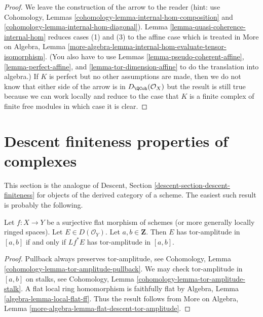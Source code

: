 \begin{proof}
We leave the construction of the arrow to the reader (hint: use
Cohomology, Lemmas \ref{cohomology-lemma-internal-hom-composition} and
\ref{cohomology-lemma-internal-hom-diagonal}).
Lemma \ref{lemma-quasi-coherence-internal-hom}
reduces cases (1) and (3) to the affine case which is treated in
More on Algebra, Lemma
\ref{more-algebra-lemma-internal-hom-evaluate-tensor-isomorphism}.
(You also have to use Lemmas \ref{lemma-pseudo-coherent-affine},
\ref{lemma-perfect-affine}, and \ref{lemma-tor-dimension-affine}
to do the translation into algebra.)
If $K$ is perfect but no other assumptions are made, then we
do not know that either side of the arrow is in $D_\QCoh(\mathcal{O}_X)$
but the result is still true because we can work locally and reduce
to the case that $K$ is a finite complex of finite free modules
in which case it is clear.
\end{proof}





\section{Descent finiteness properties of complexes}
\label{section-descent-finiteness}

\noindent
This section is the analogue of
Descent, Section \ref{descent-section-descent-finiteness}
for objects of the derived category of a scheme.
The easiest such result is probably the following.

\begin{lemma}
\label{lemma-tor-amplitude-descends}
Let $f : X \to Y$ be a surjective flat morphism of schemes
(or more generally locally ringed spaces).
Let $E \in D(\mathcal{O}_Y)$. Let $a, b \in \mathbf{Z}$.
Then $E$ has tor-amplitude in $[a, b]$ if and only if
$Lf^*E$ has tor-amplitude in $[a, b]$.
\end{lemma}

\begin{proof}
Pullback always preserves tor-amplitude, see
Cohomology, Lemma \ref{cohomology-lemma-tor-amplitude-pullback}.
We may check tor-amplitude in $[a, b]$ on stalks, see
Cohomology, Lemma \ref{cohomology-lemma-tor-amplitude-stalk}.
A flat local ring homomorphism is faithfully flat by
Algebra, Lemma \ref{algebra-lemma-local-flat-ff}.
Thus the result follows from
More on Algebra, Lemma
\ref{more-algebra-lemma-flat-descent-tor-amplitude}.
\end{proof}

